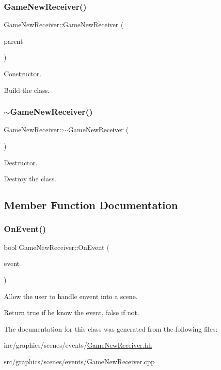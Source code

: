 \subsubsection{\texorpdfstring{Game\+New\+Receiver()}{GameNewReceiver()}}
{\footnotesize\ttfamily Game\+New\+Receiver\+::\+Game\+New\+Receiver (\begin{DoxyParamCaption}\item[{const \hyperlink{classGameNewScene}{Game\+New\+Scene} $\ast$}]{parent }\end{DoxyParamCaption})}



Constructor. 

Build the class. \mbox{\label{classGameNewReceiver_ab92b6653b56d291853a4e2f737eaf6fd}} 
\subsubsection{\texorpdfstring{$\sim$\+Game\+New\+Receiver()}{~GameNewReceiver()}}
{\footnotesize\ttfamily Game\+New\+Receiver\+::$\sim$\+Game\+New\+Receiver (\begin{DoxyParamCaption}{ }\end{DoxyParamCaption})}



Destructor. 

Destroy the class. 

\subsection{Member Function Documentation}
\mbox{\label{classGameNewReceiver_ad9ec097d8b46946ed1a21c24463fc0b6}} 
\subsubsection{\texorpdfstring{On\+Event()}{OnEvent()}}
{\footnotesize\ttfamily bool Game\+New\+Receiver\+::\+On\+Event (\begin{DoxyParamCaption}\item[{const irr\+::\+S\+Event \&}]{event }\end{DoxyParamCaption})}



Allow the user to handle envent into a scene. 

Return true if he know the event, false if not. 

The documentation for this class was generated from the following files\+:\begin{DoxyCompactItemize}
\item 
inc/graphics/scenes/events/\hyperlink{GameNewReceiver_8hh}{Game\+New\+Receiver.\+hh}\item 
src/graphics/scenes/events/Game\+New\+Receiver.\+cpp\end{DoxyCompactItemize}
